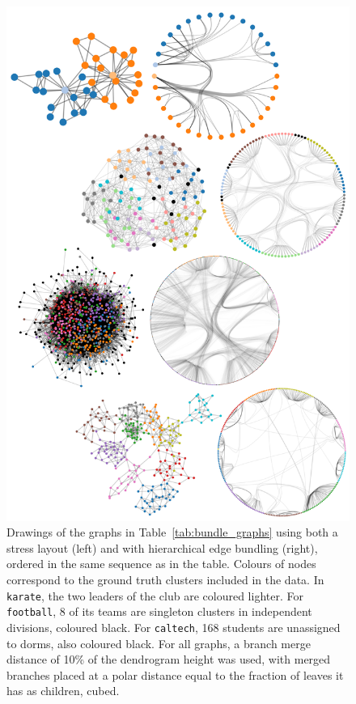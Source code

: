 \begin{figure}
  \centering
  \includegraphics[height=.8\textheight]{power/bundled.png}
  \caption[Final hierarchical edge bundled diagrams]{Drawings of the graphs in Table~\ref{tab:bundle_graphs} using both a stress layout (left) and with hierarchical edge bundling (right), ordered in the same sequence as in the table. Colours of nodes correspond to the ground truth clusters included in the data. In \texttt{karate}, the two leaders of the club are coloured lighter.
  For \texttt{football}, 8 of its teams are singleton clusters in independent divisions, coloured black. For \texttt{caltech}, 168 students are unassigned to dorms, also coloured black.
  For all graphs, a branch merge distance of 10\% of the dendrogram height was used, with merged branches placed at a polar distance equal to the fraction of leaves it has as children, cubed.}
  \label{fig:untangled_hairballs}
\end{figure}


